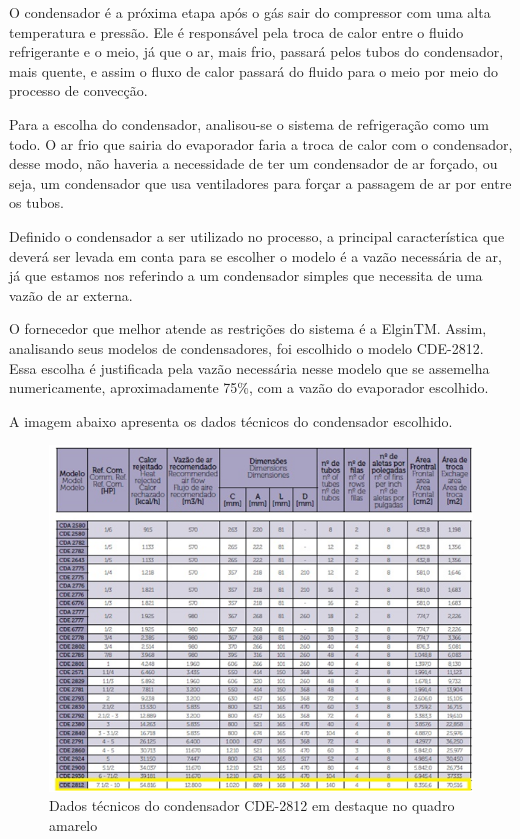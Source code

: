 O condensador é a próxima etapa após o gás sair do compressor com uma alta temperatura e pressão. Ele é responsável pela troca de calor entre o fluido refrigerante e o meio, já que o ar, mais frio, passará pelos tubos do condensador, mais quente, e assim o fluxo de calor passará do fluido para o meio por meio do processo de convecção\cite{embracocolecao}.

Para a escolha do condensador, analisou-se o sistema de refrigeração como um todo. O ar frio que sairia do evaporador faria a troca de calor com o condensador, desse modo, não haveria a necessidade de ter um condensador de ar forçado, ou seja, um condensador que usa ventiladores para forçar a passagem de ar por entre os tubos. 

Definido o condensador a ser utilizado no processo, a principal característica que deverá ser levada em conta para se escolher o modelo é a vazão necessária de ar, já que estamos nos referindo a um condensador simples que necessita de uma vazão de ar externa. 

O fornecedor que melhor atende as restrições do sistema é a ElginTM. Assim, analisando seus modelos de condensadores, foi escolhido o modelo CDE-2812. Essa escolha é justificada pela vazão necessária nesse modelo que se assemelha numericamente, aproximadamente 75\%, com a vazão do evaporador escolhido. 

A imagem abaixo apresenta os dados técnicos do condensador escolhido.
\begin{figure}[!htbp]
	 \centering
	  \includegraphics[scale=1]{editaveis/figuras/dados_tecnicos}
	  \caption[Dados técnicos do condensador]{Dados técnicos do condensador CDE-2812 em destaque no quadro amarelo\footnotemark}
	  \label{condensador}
	\end{figure}	   
	\FloatBarrier
	
